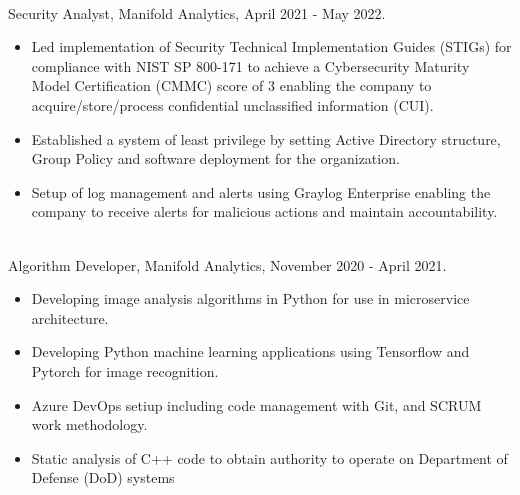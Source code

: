 \documentclass[12pt,a4paper]{article}
\begin{document}
\\
Security Analyst, Manifold Analytics, April 2021 - May 2022.
\begin{itemize}
     \item Led implementation of Security Technical Implementation Guides (STIGs) for compliance with NIST SP 800-171 to achieve a Cybersecurity Maturity Model Certification (CMMC) score of 3 enabling the company to acquire/store/process confidential unclassified information (CUI).
     \item Established a system of least privilege by setting Active Directory structure, Group Policy and software deployment for the organization.
     \item Setup of log management and alerts using Graylog Enterprise enabling the company to receive alerts for malicious actions and maintain accountability.
\end{itemize}
\\
Algorithm Developer, Manifold Analytics, November 2020 - April 2021.
\begin{itemize}
    \item Developing image analysis algorithms in Python for use in microservice architecture.
    \item Developing Python machine learning applications using Tensorflow and Pytorch for image recognition.
    \item Azure DevOps setiup including code management with Git, and SCRUM work methodology.
    \item Static analysis of C++ code to obtain authority to operate on Department of Defense (DoD) systems
\end{itemize}
    
    
\end{document}

